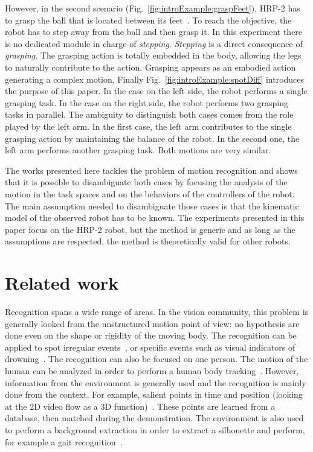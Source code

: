 \documentclass[journal]{IEEEtran}
\begin{document}
However, in the second scenario (Fig.~\ref{fig:introExample:graspFeet}),
HRP-2 has to grasp the ball that is located between its feet~\cite{kanoun10}. To reach the
objective, the robot has to step away from the ball and then grasp it. In this
experiment there is no dedicated module in charge of \emph{stepping}. \emph{Stepping} is
a direct consequence of \emph{grasping}. The grasping action is totally embedded in
the body, allowing the legs to naturally contribute to the action. Grasping
appears as an embodied action generating a complex motion. Finally Fig.~\ref{fig:introExample:spotDiff}
introduces the purpose of this paper. In the case on the left side, the robot
performs a single grasping task. In the case on the right side, the robot
performs two grasping tasks in parallel. The ambiguity to distinguish both
cases comes from the role played by the left arm. In the first case, the left
arm contributes to the single grasping action by maintaining the balance of the
robot. In the second one, the left arm performs another grasping task. Both
motions are very similar.

The works presented here tackles the problem of motion recognition and
shows that it is possible to disambiguate both cases by focusing
the analysis of the motion in the task spaces and on
the behaviors of the controllers of the robot.
The main assumption needed to disambiguate those cases is
that the kinematic model of the observed robot has to be known.
The experiments presented in this paper focus on the HRP-2 robot,
but the method is generic and as long as the assumptions
are respected, the method is theoretically valid for other robots.

\section{Related work}
Recognition spans a wide range of areas.  In the vision community, this problem is generally
looked from the unstructured motion point of view: no hypothesis
are done even on the shape or rigidity of the moving
body. The recognition can be applied to spot irregular events~\cite{stauffer00}, or specific events
such as visual indicators of drowning~\cite{eng03}. The recognition can
also be focused on one person. The motion of the human can
be analyzed in order to perform a human body tracking~\cite{shotton11}.
However, information from the environment is generally used and
the recognition is mainly done from the context. For example,
salient points in time and position (looking at the 2D video
flow as a 3D function)~\cite{laptev05}. These points are learned from a
database, then matched during the demonstration. The environment
is also used to perform a background extraction in
order to extract a silhouette and perform, for example a gait
recognition~\cite{liu05}.
\end{document}
